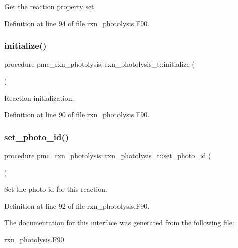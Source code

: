 Get the reaction property set. 



Definition at line 94 of file rxn\+\_\+photolysis.\+F90.

\mbox{\label{structpmc__rxn__photolysis_1_1rxn__photolysis__t_a7d6fb6521391e975f8d1ddac551cf1a6}} 
\subsubsection{\texorpdfstring{initialize()}{initialize()}}
{\footnotesize\ttfamily procedure pmc\+\_\+rxn\+\_\+photolysis\+::rxn\+\_\+photolysis\+\_\+t\+::initialize (\begin{DoxyParamCaption}{ }\end{DoxyParamCaption})\hspace{0.3cm}{\ttfamily [private]}}



Reaction initialization. 



Definition at line 90 of file rxn\+\_\+photolysis.\+F90.

\mbox{\label{structpmc__rxn__photolysis_1_1rxn__photolysis__t_a6d092343f1c5d7ba2c48fdf76099aa67}} 
\subsubsection{\texorpdfstring{set\+\_\+photo\+\_\+id()}{set\_photo\_id()}}
{\footnotesize\ttfamily procedure pmc\+\_\+rxn\+\_\+photolysis\+::rxn\+\_\+photolysis\+\_\+t\+::set\+\_\+photo\+\_\+id (\begin{DoxyParamCaption}{ }\end{DoxyParamCaption})\hspace{0.3cm}{\ttfamily [private]}}



Set the photo id for this reaction. 



Definition at line 92 of file rxn\+\_\+photolysis.\+F90.



The documentation for this interface was generated from the following file\+:\begin{DoxyCompactItemize}
\item 
\mbox{\hyperlink{rxn__photolysis_8_f90}{rxn\+\_\+photolysis.\+F90}}\end{DoxyCompactItemize}
